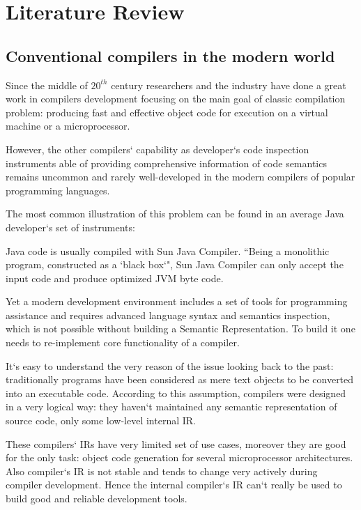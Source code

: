 \chapter{Literature Review}
\label{chap:lr}

\section{Conventional compilers in the modern world}
\label{sec:review_1}

Since the middle of $20^{th}$ century researchers and the industry have done a great
work in compilers development focusing on the main goal of classic compilation
problem: producing fast and effective object code for execution on a virtual
machine or a microprocessor.


However, the other compilers` capability as developer`s code inspection
instruments able of providing comprehensive information of code semantics
remains uncommon and rarely well-developed in the modern compilers of
popular programming languages.


The most common illustration of this problem can be found in an average Java
developer`s set of instruments:

Java code is usually compiled with Sun Java Compiler. ``Being a
monolithic program, constructed as a `black box`"\cite{Zouev2005}, Sun Java Compiler can only accept the input
code and produce optimized JVM byte code.


Yet a modern development environment includes a set of tools for
programming assistance and requires advanced language syntax and
semantics inspection, which is not possible without building a Semantic
Representation\cite{Zouev2005}. To build it one needs to re-implement core functionality of a
compiler.


It`s easy to understand the very reason of the issue looking back to the past:
traditionally programs have been considered as mere text objects to be
converted into an executable code. According to this assumption, compilers
were designed in a very logical way: they haven`t maintained any semantic
representation of source code, only some low-level internal IR.


These compilers` IRs have very limited set of use cases\cite{Zouev2005, Zouev2010}, moreover they are
good for the only task: object code generation for several microprocessor
architectures. Also compiler`s IR is not stable and tends to change very actively
during compiler development\cite{FreeSoftwareFoundation2016}. Hence the internal compiler`s IR can`t really
be used to build good and reliable development tools.


